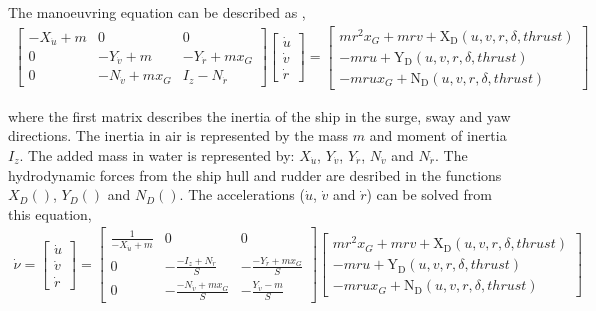 The manoeuvring equation can be described as \cite{fossen_handbook_2011},
\begin{equation}\label{equation:02.01_manoeuvring models:eqqsystem}
\begin{split}\displaystyle \left[\begin{matrix}- X_{\dot{u}} + m & 0 & 0\\0 & - Y_{\dot{v}} + m & - Y_{\dot{r}} + m x_{G}\\0 & - N_{\dot{v}} + m x_{G} & I_{z} - N_{\dot{r}}\end{matrix}\right] \left[\begin{matrix}\dot{u}\\\dot{v}\\\dot{r}\end{matrix}\right] = \left[\begin{matrix}m r^{2} x_{G} + m r v + \operatorname{X_{D}}{\left(u,v,r,\delta,thrust \right)}\\- m r u + \operatorname{Y_{D}}{\left(u,v,r,\delta,thrust \right)}\\- m r u x_{G} + \operatorname{N_{D}}{\left(u,v,r,\delta,thrust \right)}\end{matrix}\right]\end{split}
\end{equation}

\noindent where the first matrix describes the inertia of the ship in the surge, sway and yaw directions. The inertia in air is represented by the mass $m$ and moment of inertia $I_z$. The added mass in water is represented by: $X_{\dot{u}}$, $Y_{\dot{v}}$, $Y_{\dot{r}}$, $N_{\dot{v}}$ and $N_{\dot{r}}$. The hydrodynamic forces from the ship hull and rudder are desribed in the functions $X_D()$, $Y_D()$ and $N_D()$. The accelerations ($\dot{u}$, $\dot{v}$ and $\dot{r}$) can be solved from this equation,
\begin{equation}\label{equation:02.01_manoeuvring models:eqacc}
\begin{split}\displaystyle \dot{\nu} = \left[\begin{matrix}\dot{u}\\\dot{v}\\\dot{r}\end{matrix}\right] = \left[\begin{matrix}\frac{1}{- X_{\dot{u}} + m} & 0 & 0\\0 & - \frac{- I_{z} + N_{\dot{r}}}{S} & - \frac{- Y_{\dot{r}} + m x_{G}}{S}\\0 & - \frac{- N_{\dot{v}} + m x_{G}}{S} & - \frac{Y_{\dot{v}} - m}{S}\end{matrix}\right] \left[\begin{matrix}m r^{2} x_{G} + m r v + \operatorname{X_{D}}{\left(u,v,r,\delta,thrust \right)}\\- m r u + \operatorname{Y_{D}}{\left(u,v,r,\delta,thrust \right)}\\- m r u x_{G} + \operatorname{N_{D}}{\left(u,v,r,\delta,thrust \right)}\end{matrix}\right]\end{split}
\end{equation}

